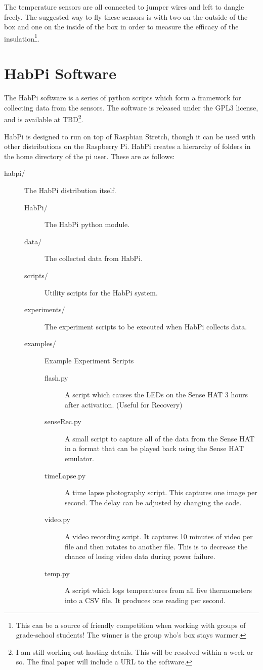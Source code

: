 \documentclass[journal]{new-aiaa}
\begin{document}
The temperature sensors are all connected to jumper wires and left to
dangle freely.  The suggested way to fly these sensors is with two on
the outside of the box and one on the inside of the box in order to
measure the efficacy of the insulation\footnote{This can be
a source of friendly competition when working with groups of
grade-school students! The winner is the group who's box stays warmer.}.

\section{HabPi Software}
The HabPi software is a series of python scripts which form
a framework for collecting data from the sensors.  The software is
released under the GPL3 license, and is available at TBD\footnote{I am
still working out hosting details.  This will be resolved within
a week or so. The final paper will include a URL to the software.}.

HabPi is designed to run on top of Raspbian Stretch, though it can be
used with other distributions on the Raspberry Pi. HabPi creates
a hierarchy of folders in the home directory of the pi user.  These
are as follows:
\begin{description}
    \item[habpi/] The HabPi distribution itself.
    \begin{description}
        \item[HabPi/] The HabPi python module.
        \item[data/] The collected data from HabPi.
        \item[scripts/] Utility scripts for the HabPi system.
        \item[experiments/] The experiment scripts to be executed when
        HabPi collects data.
        \item[examples/] Example Experiment Scripts
        \begin{description}
            \item[flash.py] A script which causes the LEDs
            on the Sense HAT 3 hours after activation.  (Useful for
            Recovery)
            \item[senseRec.py] A small script to capture all of the
            data from the Sense HAT in a format that can be played
            back using the Sense HAT emulator.
            \item[timeLapse.py] A time lapse photography script.  This
            captures one image per second.  The delay can be adjusted
            by changing the code.
            \item[video.py] A video recording script.  It captures 10
            minutes of video per file and then rotates to another
            file.  This is to decrease the chance of losing video data
            during power failure.
            \item[temp.py] A script which logs temperatures from all
            five thermometers into a CSV file.  It produces one
            reading per second.
        \end{description}
    \end{description}
\end{description}
\end{document}
